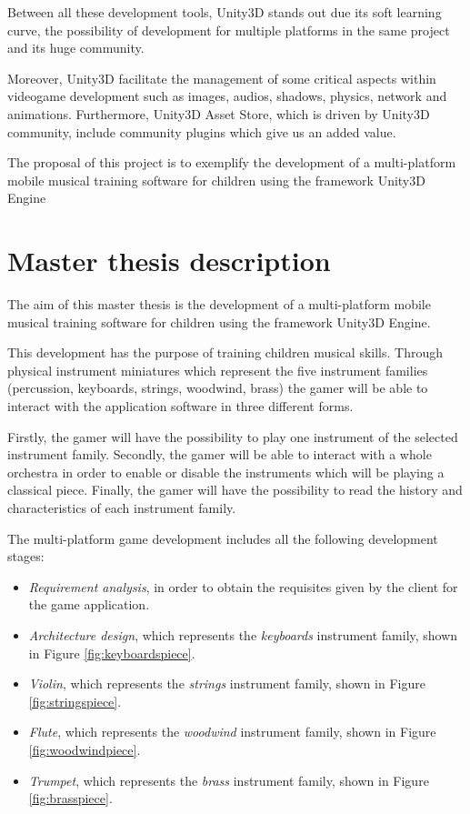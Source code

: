 Between all these development tools, Unity3D stands out due its soft learning curve, the possibility of development for multiple platforms in the same project and its huge community.

Moreover, Unity3D facilitate the management of some critical aspects within videogame development such as images, audios, shadows, physics, network and animations. Furthermore, Unity3D Asset Store, which is driven by Unity3D community, include community plugins which give us an added value.

The proposal of this project is to exemplify the development of a multi-platform mobile musical training software for children using the framework Unity3D Engine 

\section{Master thesis description}

The aim of this master thesis is the development of a multi-platform mobile musical training software for children using the framework Unity3D Engine.

This development has the purpose of training children musical skills. Through physical instrument miniatures which represent the five instrument families (percussion, keyboards, strings, woodwind, brass) the gamer will be able to interact with the application software in three different forms.

Firstly, the gamer will have the possibility to play one instrument of the selected instrument family. Secondly, the gamer will be able to interact with a whole orchestra in order to enable or disable the instruments which will be playing a classical piece. Finally, the gamer will have the possibility to read the history and characteristics of each instrument family.

The multi-platform game development includes all the following development stages:
\begin{itemize}
\item \textit{Requirement analysis}, in order to obtain the requisites given by the client for the game application.
\item \textit{Architecture design}, which represents the \textit{keyboards} instrument family, shown in Figure \ref{fig:keyboardspiece}.
\item \textit{Violin}, which represents the \textit{strings} instrument family, shown in Figure \ref{fig:stringspiece}.
\item \textit{Flute}, which represents the \textit{woodwind} instrument family, shown in Figure \ref{fig:woodwindpiece}.
\item \textit{Trumpet}, which represents the \textit{brass} instrument family, shown in Figure \ref{fig:brasspiece}.
\end{itemize}


